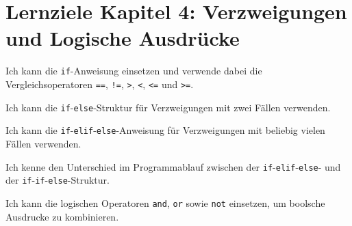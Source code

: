 \section*{Lernziele Kapitel 4: Verzweigungen und Logische Ausdrücke}
\begin{todolist}
    \item Ich kann die \lstinline|if|-Anweisung einsetzen und verwende dabei die Vergleichsoperatoren \lstinline|==|, \lstinline|!=|, \lstinline|>|, \lstinline|<|, \lstinline|<=| und \lstinline|>=|.
    \item Ich kann die \lstinline|if|-\lstinline|else|-Struktur für Verzweigungen mit zwei Fällen verwenden.
    \item Ich kann die \lstinline|if|-\lstinline|elif|-\lstinline|else|-Anweisung für Verzweigungen mit beliebig vielen Fällen verwenden.
    \item Ich kenne den Unterschied im Programmablauf zwischen der \lstinline|if|-\lstinline|elif|-\lstinline|else|- und der \lstinline|if|-\lstinline|if|-\lstinline|else|-Struktur.
    \item Ich kann die logischen Operatoren \lstinline|and|, \lstinline|or| sowie \lstinline|not| einsetzen, um boolsche Ausdrucke zu kombinieren.
\end{todolist}

